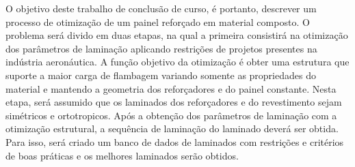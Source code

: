O objetivo deste trabalho de conclusão de curso, é portanto, descrever um processo de otimização de um painel reforçado em material composto. O problema será divido em duas etapas, na qual a primeira consistirá na otimização dos parâmetros de laminação aplicando restrições de projetos presentes na indústria aeronáutica. A função objetivo da otimização é obter uma estrutura que suporte a maior carga de flambagem variando somente as propriedades do material e mantendo a geometria dos reforçadores e do painel constante. Nesta etapa, será assumido que os laminados dos reforçadores e do revestimento sejam simétricos e ortotropicos. Após a obtenção dos parâmetros de laminação com a otimização estrutural, a sequência de laminação do laminado deverá ser obtida. Para isso, será criado um banco de dados de laminados com restrições e critérios de boas práticas e os melhores laminados serão obtidos.



